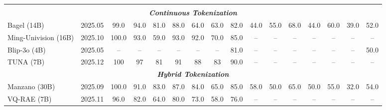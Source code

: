 \documentclass[11pt, a4paper, logo, copyright]{googledeepmind}
\begin{document}
\begin{table}[t]
{\begin{tabular}{l c  ccccccc  ccccccc}
    \rowcolor{gray!10}
    \multicolumn{16}{l}{\textbf{Unified Multimodal LLMs}} \\
    
    \multicolumn{16}{c}{\textbf{\textit{Continuous Tokenization}}} \\
    Bagel (14B)           & 2025.05   & 99.0 & 94.0 & 81.0 & 88.0 & 64.0 & 63.0 & 82.0 & 44.0 & 55.0 & 68.0 & 44.0 & 60.0 & 39.0 & 52.0 \\
    Ming-Univision (16B)  & 2025.10   & 100.0   & 93.0   & 59.0   & 93.0   & 92.0   & 70.0   & 85.0 & --   & --   & --   & --   & --   & --   & --   \\
    Blip-3o (4B)          & 2025.05   & --   & --   & --   & --   & --   & --   & 81.0 & --   & --   & --   & --   & --   & --   & 50.0 \\
    TUNA (7B)             & 2025.12   & 100   & 97   & 81   & 91   & 88   & 83   & 90.0 & --   & --   & --   & --   & --   & --   & --   \\

    \multicolumn{16}{c}{\textbf{\textit{Hybrid Tokenization}}} \\
    Manzano (30B)         & 2025.09   & 100.0 & 91.0 & 83.0 & 87.0 & 84.0 & 65.0 & 85.0 & 58.0 & 50.0 & 65.0 & 50.0 & 55.0 & 32.0 & 54.0 \\
    VQ-RAE (7B)  & 2025.11   & 96.0 & 82.0 & 64.0 & 80.0 & 73.0 & 58.0 & 76.0 & -- & -- & -- & -- & -- & -- & -- \\


\end{tabular}}
\end{table}
\end{document}
